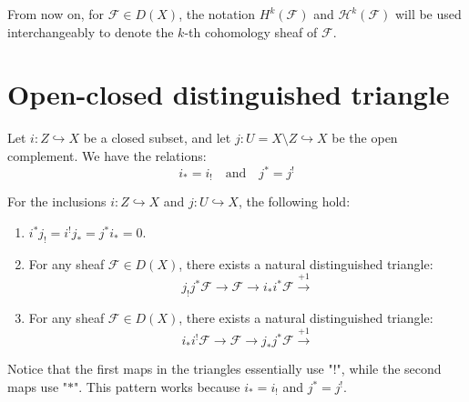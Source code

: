 
\begin{remark}
    From now on, for $\mathcal{F}\in D(X)$, the notation $H^k(\mathcal{F})$ and $\mathcal{H}^k(\mathcal{F})$ will be used interchangeably to denote the $k$-th cohomology sheaf of $\mathcal{F}$.
\end{remark}

\section{Open-closed distinguished triangle}

Let $i \colon Z \hookrightarrow X$ be a closed subset, and let $j \colon U = X \setminus Z \hookrightarrow X$ be the open complement. We have the relations:
\begin{equation*}
    i_* = i_! \quad \text{and} \quad j^* = j^!
\end{equation*}

\begin{theorem}
For the inclusions $i \colon Z \hookrightarrow X$ and $j \colon U \hookrightarrow X$, the following hold:
\begin{enumerate}
    \item $i^* j_! = i^! j_* = j^* i_* = 0$.
    \item For any sheaf $\mathcal{F} \in D(X)$, there exists a natural distinguished triangle:
    \begin{equation*}
        j_! j^* \mathcal{F} \longrightarrow \mathcal{F} \longrightarrow i_* i^* \mathcal{F} \xrightarrow{+1}
    \end{equation*}
    \item For any sheaf $\mathcal{F} \in D(X)$, there exists a natural distinguished triangle:
    \begin{equation*}
        i_* i^! \mathcal{F} \longrightarrow \mathcal{F} \longrightarrow j_* j^* \mathcal{F} \xrightarrow{+1}
    \end{equation*}
\end{enumerate}
\end{theorem}

\begin{remark}
    Notice that the first maps in the triangles essentially use "$!$", while the second maps use "$*$". This pattern works because $i_* = i_!$ and $j^* = j^!$.
\end{remark}

